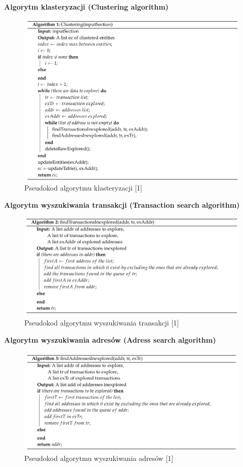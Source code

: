 \documentclass[12pt,oneside,a4paper]{book}
\begin{document}
\textbf{Algorytm klasteryzacji (Clustering algorithm)}
\newline
\begin{figure}[H]
    \centering
    \includegraphics[scale=0.65]{Clustering-alg}
    \caption{Pseudokod algorytmu klasteryzacji [1]}
\end{figure}
\textbf{Algorytm wyszukiwania transakcji (Transaction search algorithm)}
\newline
\begin{figure}[H]
    \centering
    \includegraphics[scale=0.65]{TS-alg}
    \caption{Pseudokod algorytmu wyszukiwania transakcji [1]}
\end{figure}
\textbf{Algorytm wyszukiwania adresów (Adress search algorithm)}
\newline
\begin{figure}[H]
    \centering
    \includegraphics[scale=0.65]{AS-alg}
    \caption{Pseudokod algorytmu wyszukiwania adresów [1]}
\end{figure}
\end{document}
